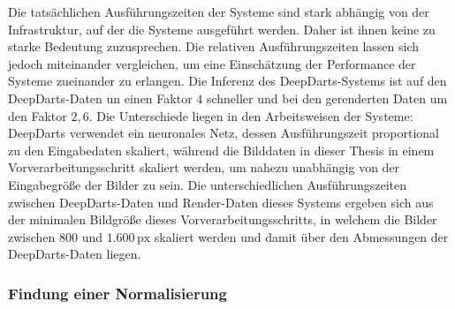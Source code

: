 Die tatsächlichen Ausführungszeiten der Systeme sind stark abhängig von der Infrastruktur, auf der die Systeme ausgeführt werden. Daher ist ihnen keine zu starke Bedeutung zuzusprechen. Die relativen Ausführungszeiten lassen sich jedoch miteinander vergleichen, um eine Einschätzung der Performance der Systeme zueinander zu erlangen. Die Inferenz des DeepDarts-Systems ist auf den DeepDarts-Daten un einen Faktor $4$ schneller und bei den gerenderten Daten um den Faktor $2,6$. Die Unterschiede liegen in den Arbeitsweisen der Systeme: DeepDarts verwendet ein neuronales Netz, dessen Ausführungszeit proportional zu den Eingabedaten skaliert, während die Bilddaten in dieser Thesis in einem Vorverarbeitungsschritt skaliert werden, um nahezu unabhängig von der Eingabegröße der Bilder zu sein. Die unterschiedlichen Ausführungszeiten zwischen DeepDarts-Daten und Render-Daten dieses Systems ergeben sich aus der minimalen Bildgröße dieses Vorverarbeitungsschritts, in welchem die Bilder zwischen $800$ und $1.600\,\text{px}$ skaliert werden und damit über den Abmessungen der DeepDarts-Daten liegen.

\subsubsection{Findung einer Normalisierung} %
\label{sec:findung_normalisierung}

\CVNorm

